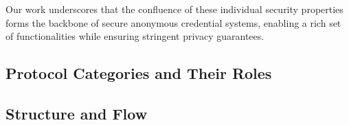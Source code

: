 Our work underscores that the confluence of these individual security properties forms the backbone of secure anonymous credential systems, enabling a rich set of functionalities while ensuring stringent privacy guarantees.


\subsection{Protocol Categories and Their Roles}


\subsection{Structure and Flow}
%


















